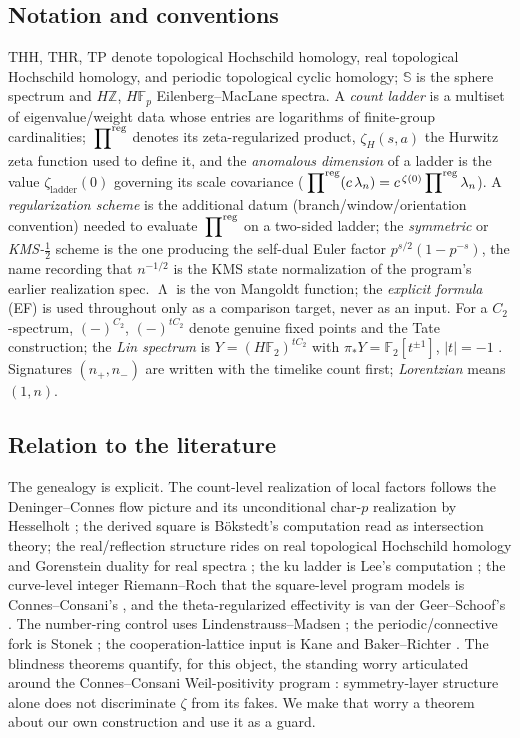 \documentclass[11pt,reqno]{amsart}
\theoremstyle{plain}
\theoremstyle{definition}
\theoremstyle{remark}
\newcommand{\Z}{\mathbb{Z}}
\newcommand{\F}{\mathbb{F}}
\newcommand{\Sph}{\mathbb{S}}
\newcommand{\THH}{\mathrm{THH}}
\newcommand{\THR}{\mathrm{THR}}
\newcommand{\TP}{\mathrm{TP}}
\newcommand{\HZ}{H\Z}
\newcommand{\ku}{\mathrm{ku}}
\newcommand{\prodreg}{\sideset{}{^{\mathrm{reg}}}\prod}
\DeclareMathOperator{\Lam}{\Lambda}
\begin{document}
\subsection{Notation and conventions}

$\THH$, $\THR$, $\TP$ denote topological Hochschild homology, real topological Hochschild
homology, and periodic topological cyclic homology; $\Sph$ is the sphere spectrum and
$\HZ$, $H\F_p$ Eilenberg--MacLane spectra. A \emph{count ladder} is a multiset of
eigenvalue/weight data whose entries are logarithms of finite-group cardinalities;
$\prodreg$ denotes its zeta-regularized product, $\zeta_H(s, a)$ the Hurwitz zeta function
used to define it, and the \emph{anomalous dimension} of a ladder is the value
$\zeta_{\mathrm{ladder}}(0)$ governing its scale covariance ($\prodreg (c\,\lambda_n) =
c^{\,\zeta(0)} \prodreg \lambda_n$). A \emph{regularization scheme} is the additional datum
(branch/window/orientation convention) needed to evaluate $\prodreg$ on a two-sided ladder;
the \emph{symmetric} or \emph{KMS-$\tfrac12$} scheme is the one producing the self-dual
Euler factor $p^{s/2}(1 - p^{-s})$, the name recording that $n^{-1/2}$ is the KMS state
normalization of the program's earlier realization spec. $\Lam$ is the von Mangoldt
function; the \emph{explicit formula} (EF) is used throughout only as a comparison target,
never as an input. For a $C_2$-spectrum, $(-)^{C_2}$, $(-)^{tC_2}$ denote genuine fixed
points and the Tate construction; the \emph{Lin spectrum} is $Y = (H\F_2)^{tC_2}$ with
$\pi_* Y = \F_2[t^{\pm 1}]$, $|t| = -1$ \cite{GM95}. Signatures $(n_+, n_-)$ are written
with the timelike count first; \emph{Lorentzian} means $(1, n)$.

\subsection{Relation to the literature}

The genealogy is explicit. The count-level realization of local factors follows the
Deninger--Connes flow picture \cite{Deninger91,Deninger92} and its unconditional char-$p$
realization by Hesselholt \cite{Hesselholt16}; the derived square is B\"okstedt's computation
\cite{Bokstedt} read as intersection theory; the real/reflection structure rides on real
topological Hochschild homology \cite{DMPR21,QS21} and Gorenstein duality for real spectra
\cite{GreenleesMeier17,DGI06}; the $\ku$ ladder is Lee's computation \cite{Lee22}; the
curve-level integer Riemann--Roch that the square-level program models is
Connes--Consani's \cite{CCRR22,CCRR23}, and the theta-regularized effectivity is van der
Geer--Schoof's \cite{vdGS}. The number-ring control uses Lindenstrauss--Madsen \cite{LM00};
the periodic/connective fork is Stonek \cite{Stonek18}; the cooperation-lattice input is
Kane and Baker--Richter \cite{Kane81,BakerRichter05}. The blindness theorems quantify, for
this object, the standing worry articulated around the Connes--Consani Weil-positivity
program \cite{CC20}: symmetry-layer structure alone does not discriminate $\zeta$ from its
fakes. We make that worry a theorem about our own construction and use it as a guard.
\end{document}
